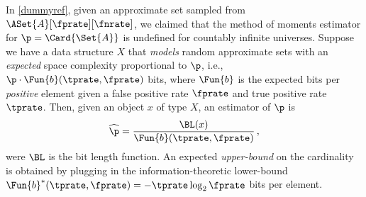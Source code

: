 \documentclass[ ../main.tex]{subfiles}
\begin{document}
In \cref{dummyref}, given an approximate set sampled from $\ASet{A}[\fprate][\fnrate]$, we claimed that the method of moments estimator for $\p = \Card{\Set{A}}$ is undefined for countably infinite universes.
Suppose we have a data structure $X$ that \emph{models} random approximate sets with an \emph{expected} space complexity proportional to $\p$, i.e., $\p \cdot \Fun{b}(\tprate,\fprate)$ bits, where $\Fun{b}$ is the expected bits per \emph{positive} element given a false positive rate $\fprate$ and true positive rate $\tprate$.
Then, given an object $x$ of type $X$, an estimator of $\p$ is
\begin{equation}
	\widehat{\p} = \frac{\BL(x)}{\Fun{b}(\tprate,\fprate)}\,,
\end{equation}
were $\BL$ is the bit length function.
An expected \emph{upper-bound} on the cardinality is obtained by plugging in the information-theoretic lower-bound $\Fun{b}^{*}(\tprate,\fprate) = -\tprate \log_2 \fprate$ bits per element.
\end{document}
